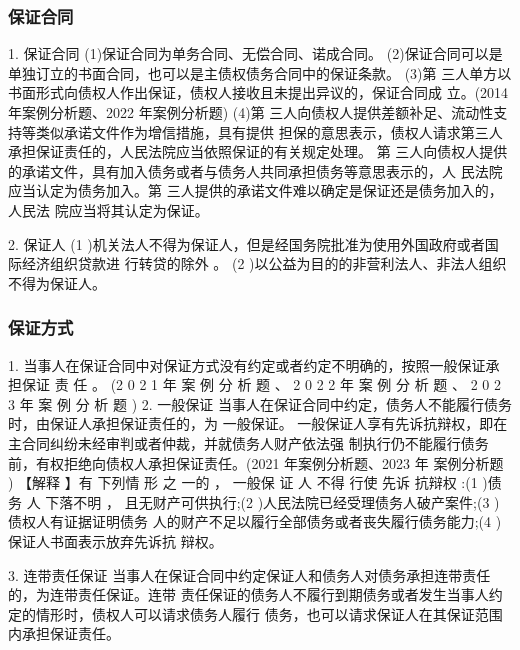 \documentclass[UTF8,12pt]{ctexart}
\numberwithin{equation}{section} %
\numberwithin{figure}{section}
\numberwithin{table}{section}
\begin{document}
	\subsubsection{保证合同}
	1. 保证合同
	(1)保证合同为单务合同、无偿合同、诺成合同。 (2)保证合同可以是单独订立的书面合同，也可以是主债权债务合同中的保证条款。 (3)第 三人单方以书面形式向债权人作出保证，债权人接收且未提出异议的，保证合同成 立。(2014年案例分析题、2022 年案例分析题)
	(4)第 三人向债权人提供差额补足、流动性支持等类似承诺文件作为增信措施，具有提供 担保的意思表示，债权人请求第三人承担保证责任的，人民法院应当依照保证的有关规定处理。 第 三人向债权人提供的承诺文件，具有加入债务或者与债务人共同承担债务等意思表示的，人 民法院应当认定为债务加入。第 三人提供的承诺文件难以确定是保证还是债务加入的，人民法 院应当将其认定为保证。
	
	2. 保证人
	(1 )机关法人不得为保证人，但是经国务院批准为使用外国政府或者国际经济组织贷款进 行转贷的除外 。
	(2 )以公益为目的的非营利法人、非法人组织不得为保证人。
	
	\subsubsection{保证方式}
	1. 当事人在保证合同中对保证方式没有约定或者约定不明确的，按照一般保证承担保证 责 任 。 (2 0 2 1 年 案 例 分 析 题 、 2 0 2 2 年 案 例 分 析 题 、 2 0 2 3 年 案 例 分 析 题 )
	2. 一般保证 当事人在保证合同中约定，债务人不能履行债务时，由保证人承担保证责任的，为 一般保证。 一般保证人享有先诉抗辩权，即在主合同纠纷未经审判或者仲裁，并就债务人财产依法强 制执行仍不能履行债务前，有权拒绝向债权人承担保证责任。(2021 年案例分析题、2023 年 案例分析题 )
	【解释 】有 下列情 形 之 一的 ， 一般保 证 人 不得 行使 先诉 抗辩权 :(1 )债务 人 下落不明 ， 且无财产可供执行;(2 )人民法院已经受理债务人破产案件;(3 )债权人有证据证明债务 人的财产不足以履行全部债务或者丧失履行债务能力;(4 )保证人书面表示放弃先诉抗
	辩权。
	
	3. 连带责任保证 当事人在保证合同中约定保证人和债务人对债务承担连带责任的，为连带责任保证。连带 责任保证的债务人不履行到期债务或者发生当事人约定的情形时，债权人可以请求债务人履行 债务，也可以请求保证人在其保证范围内承担保证责任。
	
\end{document}
